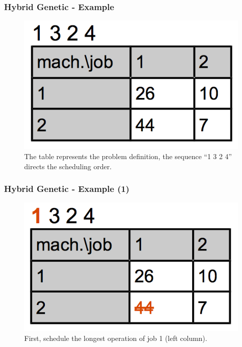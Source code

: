 \begin{frame}
  \frametitle{Hybrid Genetic - Example}

\begin{figure}[htbp]
	\centering
		\includegraphics[scale=1]{images/hyb0.png}
	\caption{The table represents the problem definition, the sequence ``1 3 2 4'' directs the scheduling order.}
	\label{fig:label}
\end{figure}
	
 
\end{frame}
\begin{frame}
  \frametitle{Hybrid Genetic - Example (1)}

\begin{figure}[htbp]
	\centering
		\includegraphics[scale=1]{images/hyb1.png}
	\caption{First, schedule the longest operation of job 1 (left column).}
	\label{fig:label}
\end{figure}
	
 
\end{frame}
